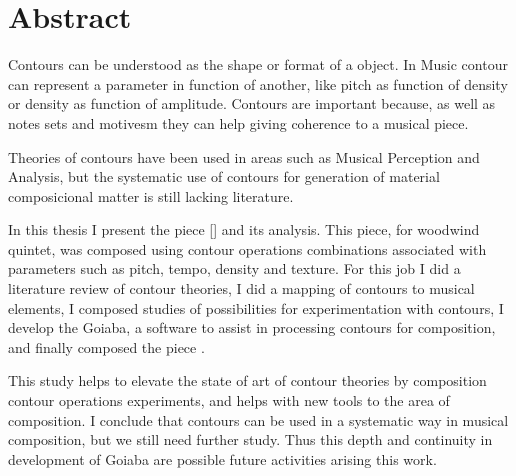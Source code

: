 \chapter*{Abstract}
\label{cha:abstract}

Contours can be understood as the shape or format of a object. In
Music contour can represent a parameter in function of another, like
pitch as function of density or density as function of
amplitude. Contours are important because, as well as notes sets and
motivesm they can help giving coherence to a musical piece.

Theories of contours have been used in areas such as Musical
Perception and Analysis, but the systematic use of contours for
generation of material composicional matter is still lacking
literature.

In this thesis I present the piece \obra{} [] and its analysis. This piece, for woodwind quintet,
was composed using contour operations combinations associated with
parameters such as pitch, tempo, density and texture. For this job I
did a literature review of contour theories, I did a mapping of
contours to musical elements, I composed studies of possibilities for
experimentation with contours, I develop the Goiaba, a software to
assist in processing contours for composition, and finally composed
the piece \obra{}.

This study helps to elevate the state of art of contour theories by
composition contour operations experiments, and helps with new tools
to the area of composition.
I conclude that contours can be used in a systematic way in musical
composition, but we still need further study. Thus this depth and
continuity in development of Goiaba are possible future activities
arising this work.
